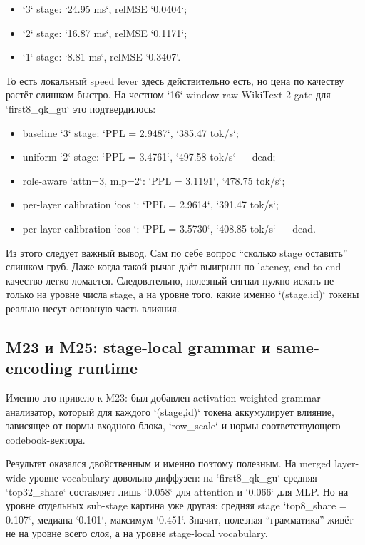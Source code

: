 \begin{itemize}[leftmargin=1.5em]
\item `3` stage: `24.95 ms`, relMSE `0.0404`;
\item `2` stage: `16.87 ms`, relMSE `0.1171`;
\item `1` stage: `8.81 ms`, relMSE `0.3407`.
\end{itemize}

То есть локальный speed lever здесь действительно есть, но цена по качеству
растёт слишком быстро. На честном `16`-window raw WikiText-2 gate для
`first8_qk_gu` это подтвердилось:

\begin{itemize}[leftmargin=1.5em]
\item baseline `3` stage: `PPL = 2.9487`, `385.47 tok/s`;
\item uniform `2` stage: `PPL = 3.4761`, `497.58 tok/s` --- dead;
\item role-aware `attn=3, mlp=2`: `PPL = 3.1191`, `478.75 tok/s`;
\item per-layer calibration `cos `: `PPL = 2.9614`, `391.47 tok/s`;
\item per-layer calibration `cos `: `PPL = 3.5730`, `408.85 tok/s` --- dead.
\end{itemize}

Из этого следует важный вывод. Сам по себе вопрос ``сколько stage оставить''
слишком груб. Даже когда такой рычаг даёт выигрыш по latency, end-to-end качество
легко ломается. Следовательно, полезный сигнал нужно искать не только на уровне
числа stage, а на уровне того, какие именно `(stage,id)` токены реально несут
основную часть влияния.

\subsection{M23 и M25: stage-local grammar и same-encoding runtime}

Именно это привело к M23: был добавлен activation-weighted grammar-анализатор,
который для каждого `(stage,id)` токена аккумулирует влияние, зависящее от
нормы входного блока, `row_scale` и нормы соответствующего codebook-вектора.

Результат оказался двойственным и именно поэтому полезным. На merged layer-wide
уровне vocabulary довольно диффузен: на `first8_qk_gu` средняя `top32_share`
составляет лишь `0.058` для attention и `0.066` для MLP. Но на уровне отдельных
sub-stage картина уже другая: средняя stage `top8_share = 0.107`, медиана
`0.101`, максимум `0.451`. Значит, полезная ``грамматика'' живёт не на уровне
всего слоя, а на уровне stage-local vocabulary.

